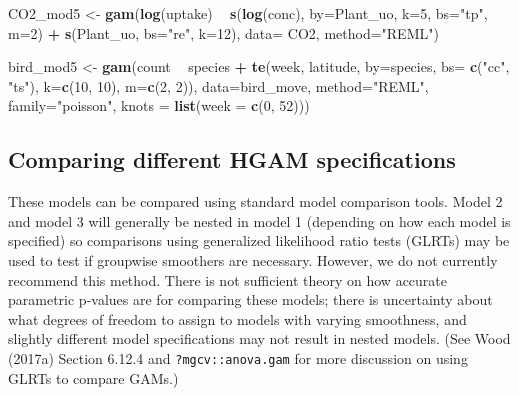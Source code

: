 \documentclass[12pt]{article}
\newenvironment{Shaded}{\begin{snugshade}}{\end{snugshade}}
\newcommand{\KeywordTok}[1]{\textcolor[rgb]{0.13,0.29,0.53}{\textbf{#1}}}
\newcommand{\DataTypeTok}[1]{\textcolor[rgb]{0.13,0.29,0.53}{#1}}
\newcommand{\DecValTok}[1]{\textcolor[rgb]{0.00,0.00,0.81}{#1}}
\newcommand{\StringTok}[1]{\textcolor[rgb]{0.31,0.60,0.02}{#1}}
\newcommand{\OperatorTok}[1]{\textcolor[rgb]{0.81,0.36,0.00}{\textbf{#1}}}
\newcommand{\NormalTok}[1]{#1}
\begin{document}
\begin{Shaded}
\begin{Highlighting}[]
\NormalTok{CO2_mod5 <-}\StringTok{ }\KeywordTok{gam}\NormalTok{(}\KeywordTok{log}\NormalTok{(uptake) }\OperatorTok{~}\StringTok{ }\KeywordTok{s}\NormalTok{(}\KeywordTok{log}\NormalTok{(conc), }\DataTypeTok{by=}\NormalTok{Plant_uo, }\DataTypeTok{k=}\DecValTok{5}\NormalTok{, }\DataTypeTok{bs=}\StringTok{"tp"}\NormalTok{, }\DataTypeTok{m=}\DecValTok{2}\NormalTok{) }\OperatorTok{+}
\StringTok{                              }\KeywordTok{s}\NormalTok{(Plant_uo, }\DataTypeTok{bs=}\StringTok{"re"}\NormalTok{, }\DataTypeTok{k=}\DecValTok{12}\NormalTok{),}
                \DataTypeTok{data=}\NormalTok{ CO2, }\DataTypeTok{method=}\StringTok{"REML"}\NormalTok{)}


\NormalTok{bird_mod5 <-}\StringTok{ }\KeywordTok{gam}\NormalTok{(count }\OperatorTok{~}\StringTok{ }\NormalTok{species }\OperatorTok{+}\StringTok{ }
\StringTok{                   }\KeywordTok{te}\NormalTok{(week, latitude, }\DataTypeTok{by=}\NormalTok{species, }\DataTypeTok{bs=} \KeywordTok{c}\NormalTok{(}\StringTok{"cc"}\NormalTok{, }\StringTok{"ts"}\NormalTok{), }
                      \DataTypeTok{k=}\KeywordTok{c}\NormalTok{(}\DecValTok{10}\NormalTok{, }\DecValTok{10}\NormalTok{), }\DataTypeTok{m=}\KeywordTok{c}\NormalTok{(}\DecValTok{2}\NormalTok{, }\DecValTok{2}\NormalTok{)),}
                 \DataTypeTok{data=}\NormalTok{bird_move, }\DataTypeTok{method=}\StringTok{"REML"}\NormalTok{, }\DataTypeTok{family=}\StringTok{"poisson"}\NormalTok{,}
                 \DataTypeTok{knots =} \KeywordTok{list}\NormalTok{(}\DataTypeTok{week =} \KeywordTok{c}\NormalTok{(}\DecValTok{0}\NormalTok{, }\DecValTok{52}\NormalTok{)))}
\end{Highlighting}
\end{Shaded}

\subsection{Comparing different HGAM
specifications}\label{comparing-different-hgam-specifications}

These models can be compared using standard model comparison tools.
Model 2 and model 3 will generally be nested in model 1 (depending on
how each model is specified) so comparisons using generalized likelihood
ratio tests (GLRTs) may be used to test if groupwise smoothers are
necessary. However, we do not currently recommend this method. There is
not sufficient theory on how accurate parametric p-values are for
comparing these models; there is uncertainty about what degrees of
freedom to assign to models with varying smoothness, and slightly
different model specifications may not result in nested models. (See
Wood (2017a) Section 6.12.4 and \texttt{?mgcv::anova.gam} for more
discussion on using GLRTs to compare GAMs.)
\end{document}
